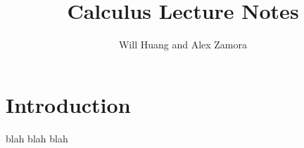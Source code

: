\documentclass[12pt]{article}
\begin{document}
\title{Calculus Lecture Notes}
\author{Will Huang and Alex Zamora}
\maketitle
\tableofcontents

\newpage 

\section{Introduction}
blah blah blah


\end{document}
